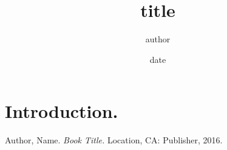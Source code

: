\documentclass{ec}
\begin{document}
\title{title}
\author{author}
\date{date}

\maketitle
\thesis{}
\tableofcontents

\section{Introduction.}

\begin{thebibliography}

  Author, Name. 
  {\em Book Title.} 
  Location, CA: Publisher, 2016.

\end{thebibliography}
\end{document}
